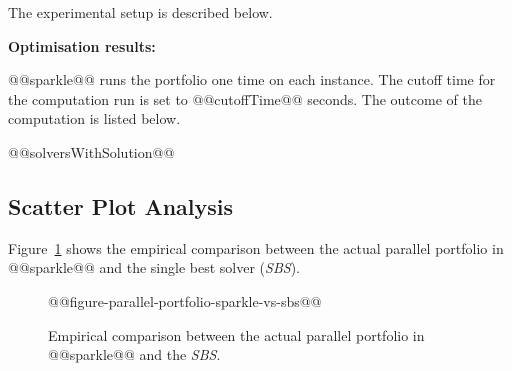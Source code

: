 \documentclass[british]{article}
\newif\ifdecision
\begin{document}
The experimental setup is described below.

\ifdecision \textbf{Performance computation:}
\else \textbf{Optimisation results:}
\fi
@@sparkle@@ runs the portfolio one time on each instance. The cutoff time for the computation run is set to @@cutoffTime@@ seconds. The outcome of the computation is listed below.
\ifdecision
The scores of the outcomes are calculated according to PAR10, this means that for each instance the solver which solved the instance is scored its runtime and the remaining solvers are scored the runtime times ten. If however the portfolio reaches the cutofftime, which means that no solvers solved the instance, all solvers are scored the cutofftime times ten.
\fi

\begin{enumerate}
@@solversWithSolution@@
\end{enumerate}
\ifdecision
In the table below the computed PAR10 scores of all solvers have been listed aswell as the portfolio itself.
\begin{table}[ht]
@@resultsTable@@
\end{table}
\fi
\subsection{Scatter Plot Analysis}
\label{sec:Scatter_Plot_Analysis}

Figure~\ref{fig:sparkle_vs_sbs} shows the empirical comparison between the actual parallel portfolio in @@sparkle@@ and the single best solver (\emph{SBS}).

\begin{figure}[htbp]
\noindent \begin{centering}
    @@figure-parallel-portfolio-sparkle-vs-sbs@@
\par\end{centering}

\caption{Empirical comparison between the actual parallel portfolio in @@sparkle@@ and the \emph{SBS}.}\label{fig:sparkle_vs_sbs}
\end{figure}



\end{document}
